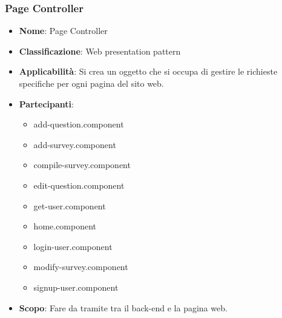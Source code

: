 \documentclass[12pt]{article}
\begin{document}
		\subsubsection{Page Controller} 
		\begin{itemize}
			\item \textbf{Nome}: Page Controller
			\item \textbf{Classificazione}: Web presentation pattern
			\item \textbf{Applicabilità}: Si crea un oggetto che si occupa di gestire le richieste specifiche per ogni pagina del sito web.
			\item \textbf{Partecipanti}:
			\begin{itemize}
				\item add-question.component
				\item add-survey.component
				\item compile-survey.component
				\item edit-question.component
				\item get-user.component
				\item home.component
				\item login-user.component
				\item modify-survey.component
				\item signup-user.component
			\end{itemize}
			\item \textbf{Scopo}: Fare da tramite tra il back-end e la pagina web.
		\end{itemize}
\end{document}

